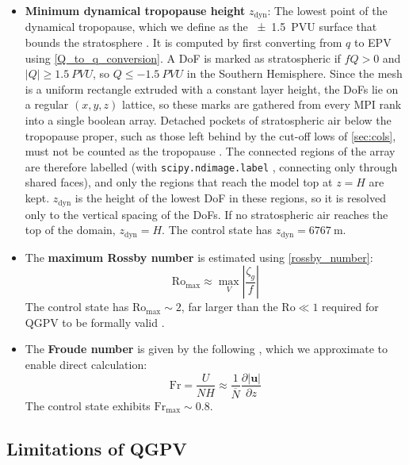 \documentclass{article}
\begin{document}
\begin{itemize}
    \item \textbf{Minimum dynamical tropopause height} $z_\text{dyn}$:
    The lowest point of the dynamical tropopause, which we define as the \qty{\pm 1.5}{PVU} surface that bounds the stratosphere \cite{Barnes2021col}.
    It is computed by first converting from $q$ to EPV using \cref{Q_to_q_conversion}.
    A DoF is marked as stratospheric if $fQ>0$ and $|Q| \geq \qty{1.5}{PVU}$, so $Q \leq \qty{-1.5}{PVU}$ in the Southern Hemisphere.
    Since the mesh is a uniform rectangle extruded with a constant layer height, the DoFs lie on a regular $(x,y,z)$ lattice, so these marks are gathered from every MPI rank into a single boolean array.
    Detached pockets of stratospheric air below the tropopause proper, such as those left behind by the cut-off lows of \cref{sec:cols}, must not be counted as the tropopause \cite{Barnes2021col}.
    The connected regions of the array are therefore labelled (with \texttt{scipy.ndimage.label} \cite{scipy}, connecting only through shared faces), and only the regions that reach the model top at $z=H$ are kept.
    $z_\text{dyn}$ is the height of the lowest DoF in these regions, so it is resolved only to the vertical spacing of the DoFs.
    If no stratospheric air reaches the top of the domain, $z_\text{dyn} = H$.
    The control state has $z_\text{dyn} = \qty{6767}{\meter}$.

    \item The \textbf{maximum Rossby number} is estimated using \cref{rossby_number}:
    \begin{equation}\label{max_rossby}
        \mathrm{Ro}_\text{max} \approx \max_V \left|\frac{\zeta_g}{f}\right|
    \end{equation}
    The control state has $\mathrm{Ro}_\text{max} \sim 2$, far larger than the $\mathrm{Ro} \ll 1$ required for QGPV to be formally valid \cite{Hoskins1985,Vallis2017}.

    \item The \textbf{Froude number} is given by the following \cite{Vallis2017}, which we approximate to enable direct calculation:
    \begin{equation}\label{froude_number}
        \mathrm{Fr} = \frac{U}{NH} \approx \frac{1}{\overline{N}} \frac{\partial \left|\bm{u}\right|}{\partial z}
    \end{equation}
    The control state exhibits $\mathrm{Fr}_\text{max} \sim 0.8$.
\end{itemize}

\subsection{Limitations of QGPV}\label{sec:limits_of_qgpv}
\end{document}
